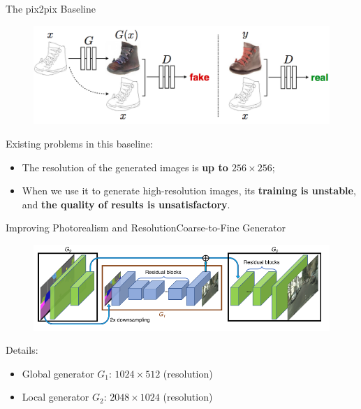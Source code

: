 \documentclass{beamer}
\begin{document}
\begin{frame}{The pix2pix Baseline }
\begin{figure}
	\centering
	\includegraphics[height=0.4\textheight]{images/baseline}
\end{figure}
%
%
\begin{beamerboxesrounded}[upper=uppercol,lower=lowercol,shadow=false]{Existing problems in this baseline:}
\begin{itemize}
	\item
	The resolution of the generated images is \textbf{up to $256\times256$};
	\item 
	When we use it to generate high-resolution images, its \textbf{training is unstable}, and \textbf{the quality of results is unsatisfactory}.
\end{itemize}
\end{beamerboxesrounded}
\end{frame}

\begin{frame}{Improving Photorealism and Resolution}{Coarse-to-Fine Generator}
	\begin{figure}
	\centering
	\includegraphics[height=0.4\textheight]{images/structure}
\end{figure}
%
%
\begin{beamerboxesrounded}[upper=uppercol,lower=lowercol,shadow=false]{Details:}
\begin{itemize}
	\item
	Global generator $G_1$: $1024\times512$ (resolution)
	\item
	Local generator $G_2$: $2048\times1024$ (resolution)
\end{itemize}
\end{beamerboxesrounded}
\end{frame}
\end{document}
